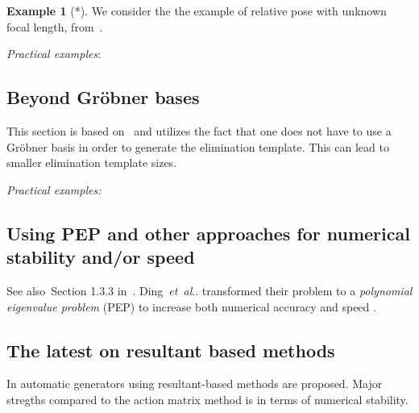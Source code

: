 \documentclass[11pt,a4paper]{article}
\makeatletter
\theoremstyle{definition}
\newtheorem{example}{Example}
\DeclareRobustCommand\etal{\emph{et~al}\@ifnextchar.{}{.\@}}
\makeatother
\begin{document}
\begin{example}[*]
We consider the the example of relative pose with unknown focal length,
from~\cite{kukelova-etal-2017-cvpr}.
\end{example}

\emph{Practical examples}: \cite{kukelova-etal-2017-cvpr,ding-etal-2019-iccv,barath-kukelova-iccv-2019,valtonenoernhag-icpram-2019}

\subsection{Beyond Gröbner bases}
This section is based on~\cite{larsson2018cvpr} and utilizes the fact that one does not
have to use a Gröbner basis in order to generate the elimination template.
This can lead to smaller elimination template sizes.

\emph{Practical examples:}~\cite{valtonenoernhag-springer-2021}

\subsection{Using PEP and other approaches for numerical stability and/or speed}
See also~Section 1.3.3 in~\cite{larsson-phd}.
Ding~\etal{} transformed their problem to a \emph{polynomial eigenvalue problem} (PEP)
to increase both numerical accuracy and speed \cite{ding-etal-tpami-2020,ding-etal-cvpr-2020}.

\subsection{The latest on resultant based methods}
In \cite{bhayani-etal-cvpr-2020,bhayani-etal-arxiv-2020} automatic generators using
resultant-based methods are proposed. Major stregths compared to the action matrix method is
in terms of numerical stability.


{\small
}
\end{document}
